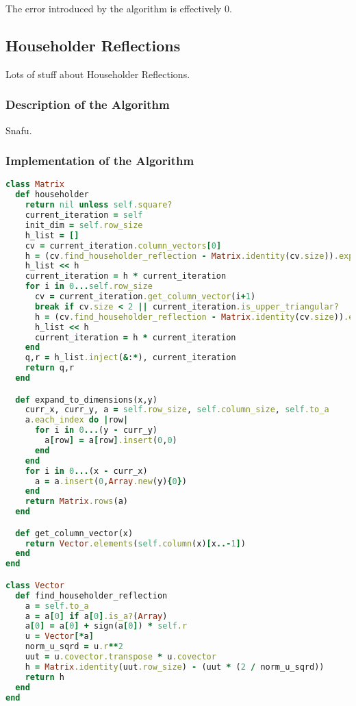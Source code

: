 \documentclass[letterpaper,12pt]{article}
\begin{document}
The error introduced by the algorithm is effectively $0$.

\subsection{Householder Reflections}

Lots of stuff about Householder Reflections.

\subsubsection{Description of the Algorithm}

Snafu.

\subsubsection{Implementation of the Algorithm}

\lstset{caption=QR Decomposition via Householder Reflections}
\begin{lstlisting}[language=ruby]
class Matrix
  def householder
    return nil unless self.square?
    current_iteration = self
    init_dim = self.row_size
    h_list = []
    cv = current_iteration.column_vectors[0]
    h = (cv.find_householder_reflection - Matrix.identity(cv.size)).expand_to_dimensions(init_dim,init_dim) + Matrix.identity(init_dim)
    h_list << h
    current_iteration = h * current_iteration
    for i in 0...self.row_size
      cv = current_iteration.get_column_vector(i+1)
      break if cv.size < 2 || current_iteration.is_upper_triangular?
      h = (cv.find_householder_reflection - Matrix.identity(cv.size)).expand_to_dimensions(init_dim,init_dim) + Matrix.identity(init_dim)
      h_list << h
      current_iteration = h * current_iteration
    end
    q,r = h_list.inject(&:*), current_iteration
    return q,r
  end

  def expand_to_dimensions(x,y)
    curr_x, curr_y, a = self.row_size, self.column_size, self.to_a
    a.each_index do |row|
      for i in 0...(y - curr_y)
        a[row] = a[row].insert(0,0)
      end
    end
    for i in 0...(x - curr_x)
      a = a.insert(0,Array.new(y){0})
    end
    return Matrix.rows(a)
  end

  def get_column_vector(x)
    return Vector.elements(self.column(x)[x..-1])
  end
end

class Vector
  def find_householder_reflection
    a = self.to_a
    a = a[0] if a[0].is_a?(Array)
    a[0] = a[0] + sign(a[0]) * self.r
    u = Vector[*a]
    norm_u_sqrd = u.r**2
    uut = u.covector.transpose * u.covector
    h = Matrix.identity(uut.row_size) - (uut * (2 / norm_u_sqrd))
    return h
  end
end
\end{lstlisting}
\end{document}
